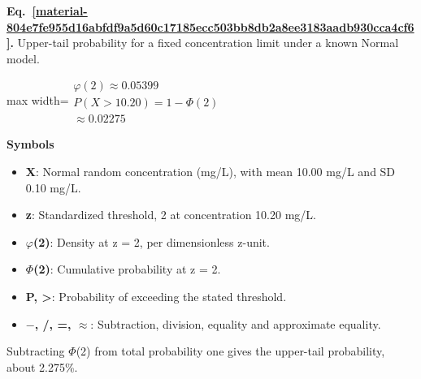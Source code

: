 \documentclass[11pt,a4paper]{article}
\begin{document}
\par\medskip
\noindent\begin{minipage}{\linewidth}
\label{material-804e7fe955d16abfdf9a5d60c17185ecc503bb8db2a8ee3183aadb930cca4cf6}
\noindent\textbf{Eq.~\ref*{material-804e7fe955d16abfdf9a5d60c17185ecc503bb8db2a8ee3183aadb930cca4cf6}.} Upper-tail probability for a fixed concentration limit under a known Normal model.\par\nopagebreak
\begin{center}\begin{adjustbox}{max width=\linewidth}$\displaystyle \begin{gathered}\varphi(2)\approx0.05399\\P(X>10.20)=1-\Phi(2)\\\approx0.02275\end{gathered}$\end{adjustbox}\end{center}

\par\noindent\textbf{Symbols}

\begin{itemize}\setlength{\itemsep}{1pt}\setlength{\parsep}{0pt}
\item \textbf{X}: Normal random concentration (mg/L), with mean 10.00 mg/L and SD 0.10 mg/L.
\item \textbf{z}: Standardized threshold, 2 at concentration 10.20 mg/L.
\item \textbf{\ensuremath{\varphi}(2)}: Density at z = 2, per dimensionless z-unit.
\item \textbf{\ensuremath{\Phi}(2)}: Cumulative probability at z = 2.
\item \textbf{P, >}: Probability of exceeding the stated threshold.
\item \textbf{\ensuremath{-}, /, =, \ensuremath{\approx}}: Subtraction, division, equality and approximate equality.
\end{itemize}

Subtracting \ensuremath{\Phi}(2) from total probability one gives the upper-tail probability, about 2.275\%.

\end{minipage}\par
\medskip
\end{document}
